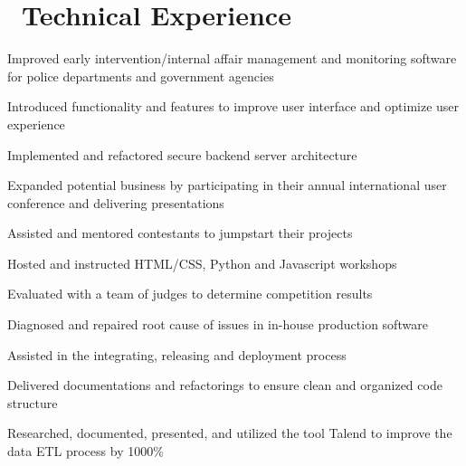 \documentclass[]{ez-resume-config}
\begin{document}
\begin{minipage}[t]{0.66\textwidth}
\section{\faClipboard \ Technical Experience}

\begin{tightemize}
    \item Improved early intervention/internal affair management and monitoring software for police departments and government agencies
    \item Introduced functionality and features to improve user interface and optimize user experience
    \item Implemented and refactored secure backend server architecture
    \item Expanded potential business by participating in their annual international user conference and delivering presentations
\end{tightemize}
\sectionsep

\begin{tightemize}
    \item Assisted and mentored contestants to jumpstart their projects 
    \item Hosted and instructed HTML/CSS, Python and Javascript workshops
    \item Evaluated with a team of judges to determine competition results
\end{tightemize}
\sectionsep

\begin{tightemize}
    \item Diagnosed and repaired root cause of issues in in-house production software
    \item Assisted in the integrating, releasing and deployment process
    \item Delivered documentations and refactorings to ensure clean and organized code structure
    \item Researched, documented, presented, and utilized the tool Talend to improve the data ETL process by 1000\%
\end{tightemize}
\sectionsep

\end{minipage} 
\end{document}
